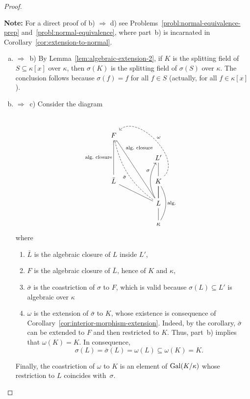 \begin{proof}${}$

    \textbf{Note:} For a direct proof of b) $\Rightarrow$ d) see Problems~\ref{probl:normal-equivalence-prep} and~\ref{probl:normal-equivalence}, where part~b) is incarnated in Corollary~\ref{cor:extension-to-normal}.
    
    \begin{enumerate}[a), font=\upshape]
        \item $\Rightarrow$~b) By Lemma~\ref{lem:algebraic-extension-2}, if $K$ is the splitting field of $S\subseteq\kappa[x]$ over $\kappa$, then $\sigma(K)$ is the splitting field of $\sigma(S)$ over $\kappa$. The conclusion follows because $\sigma(f)=f$ for all $f\in S$ (actually, for all $f\in\kappa[x]$).

        \item $\Rightarrow$~c) Consider the diagram
        $$
            \begin{tikzcd}
                F\\
                    &&L'\\
                \bar L
                        \arrow[uu,"\text{alg.~closure}",no head]
                    &&K
                        \arrow[u,no head]
                        \arrow[lluu,"\omega"',dashed,bend right=90]\\
                    &&L
                        \arrow[u,no head]
                        \arrow[u,no head]
                        \arrow[uu,"\sigma",bend left,pos=0.7]
                        \arrow[llu,no head]
                        \arrow[lluuu,"\text{alg.~closure}"',no head,pos=0.8]
                        \arrow[lluuu,"\bar\sigma",dashed,bend left=20]\\
                    &&\kappa
                        \arrow[u,no head]
                        \arrow[uu,"\text{alg.}"',no head,bend right]
            \end{tikzcd}
        $$
        where
        \begin{enumerate}[-]
            \item $\bar L$ is the algebraic closure of $L$ inside $L'$,
            \item $F$ is the algebraic closure of $\bar L$, hence of $K$ and $\kappa$,
            \item $\bar\sigma$ is the coastriction of $\sigma$ to $F$, which is valid because $\sigma(L)\subseteq L'$ is algebraic over $\kappa$
            \item $\omega$ is the extension of $\bar\sigma$ to $K$, whose existence is consequence of Corollary~\ref{cor:interior-morphism-extension}. Indeed, by the corollary, $\bar\sigma$ can be extended to $F$ and then restricted to $K$. Thus, part~b) implies that $\omega(K)=K$. In consequence,
            $$
                \sigma(L)=\bar\sigma(L)=\omega(L)\subseteq\omega(K)=K.
            $$
        \end{enumerate}
        Finally, the coastriction of $\omega$ to $K$ is an element of $\operatorname{Gal}(K/\kappa)$ whose restriction to $L$ coincides with~$\sigma$.


\end{enumerate}
\end{proof}
